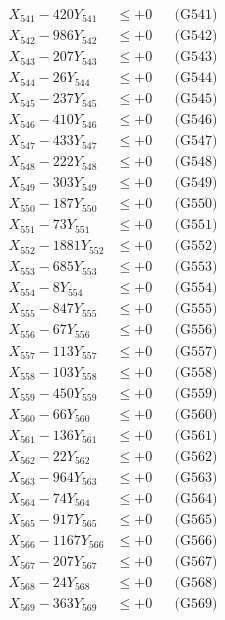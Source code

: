 \documentclass[a4paper,10pt]{article}
\begin{document}
{\begin{align}
\allowbreak
X_{541} - 420Y_{541} &\leq +0 && \text{(G541)} \\
X_{542} - 986Y_{542} &\leq +0 && \text{(G542)} \\
X_{543} - 207Y_{543} &\leq +0 && \text{(G543)} \\
X_{544} - 26Y_{544} &\leq +0 && \text{(G544)} \\
X_{545} - 237Y_{545} &\leq +0 && \text{(G545)} \\
X_{546} - 410Y_{546} &\leq +0 && \text{(G546)} \\
X_{547} - 433Y_{547} &\leq +0 && \text{(G547)} \\
X_{548} - 222Y_{548} &\leq +0 && \text{(G548)} \\
X_{549} - 303Y_{549} &\leq +0 && \text{(G549)} \\
X_{550} - 187Y_{550} &\leq +0 && \text{(G550)} \\
\allowbreak
X_{551} - 73Y_{551} &\leq +0 && \text{(G551)} \\
X_{552} - 1881Y_{552} &\leq +0 && \text{(G552)} \\
X_{553} - 685Y_{553} &\leq +0 && \text{(G553)} \\
X_{554} - 8Y_{554} &\leq +0 && \text{(G554)} \\
X_{555} - 847Y_{555} &\leq +0 && \text{(G555)} \\
X_{556} - 67Y_{556} &\leq +0 && \text{(G556)} \\
X_{557} - 113Y_{557} &\leq +0 && \text{(G557)} \\
X_{558} - 103Y_{558} &\leq +0 && \text{(G558)} \\
X_{559} - 450Y_{559} &\leq +0 && \text{(G559)} \\
X_{560} - 66Y_{560} &\leq +0 && \text{(G560)} \\
\allowbreak
X_{561} - 136Y_{561} &\leq +0 && \text{(G561)} \\
X_{562} - 22Y_{562} &\leq +0 && \text{(G562)} \\
X_{563} - 964Y_{563} &\leq +0 && \text{(G563)} \\
X_{564} - 74Y_{564} &\leq +0 && \text{(G564)} \\
X_{565} - 917Y_{565} &\leq +0 && \text{(G565)} \\
X_{566} - 1167Y_{566} &\leq +0 && \text{(G566)} \\
X_{567} - 207Y_{567} &\leq +0 && \text{(G567)} \\
X_{568} - 24Y_{568} &\leq +0 && \text{(G568)} \\
X_{569} - 363Y_{569} &\leq +0 && \text{(G569)} \\

\end{align}}
\end{document}
